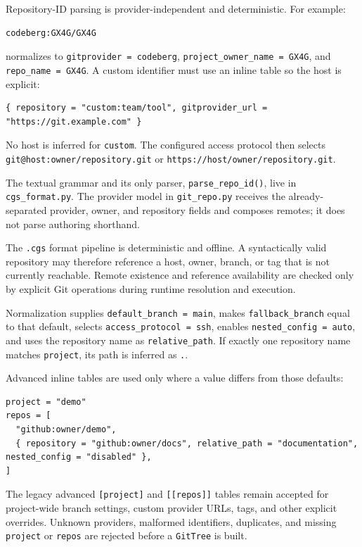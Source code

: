 Repository-ID parsing is provider-independent and deterministic. For example:

\begin{lstlisting}
codeberg:GX4G/GX4G
\end{lstlisting}

normalizes to \texttt{gitprovider = codeberg},
\texttt{project\_owner\_name = GX4G}, and
\texttt{repo\_name = GX4G}. A custom identifier must use an inline table so
the host is explicit:

\begin{lstlisting}
{ repository = "custom:team/tool", gitprovider_url = "https://git.example.com" }
\end{lstlisting}

No host is inferred for \texttt{custom}. The configured access protocol then
selects \texttt{git@host:owner/repository.git} or
\texttt{https://host/owner/repository.git}.

The textual grammar and its only parser, \texttt{parse\_repo\_id()}, live in
\texttt{cgs\_format.py}. The provider model in \texttt{git\_repo.py} receives the
already-separated provider, owner, and repository fields and composes remotes;
it does not parse authoring shorthand.

The \texttt{.cgs} format pipeline is deterministic and offline. A syntactically
valid repository may therefore reference a host, owner, branch, or tag that is
not currently reachable. Remote existence and reference availability are checked
only by explicit Git operations during runtime resolution and execution.

Normalization supplies \texttt{default\_branch = main}, makes
\texttt{fallback\_branch} equal to that default, selects
\texttt{access\_protocol = ssh}, enables \texttt{nested\_config = auto}, and
uses the repository name as \texttt{relative\_path}. If exactly one repository
name matches \texttt{project}, its path is inferred as \texttt{.}.

Advanced inline tables are used only where a value differs from those
defaults:

\begin{lstlisting}
project = "demo"
repos = [
  "github:owner/demo",
  { repository = "github:owner/docs", relative_path = "documentation", nested_config = "disabled" },
]
\end{lstlisting}

The legacy advanced \texttt{[project]} and \texttt{[[repos]]} tables remain
accepted for project-wide branch settings, custom provider URLs, tags, and
other explicit overrides.  Unknown providers, malformed identifiers,
duplicates, and missing \texttt{project} or \texttt{repos} are rejected before
a \texttt{GitTree} is built.

